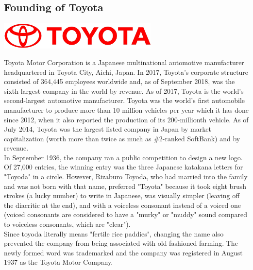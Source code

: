 \documentclass[11pt]{report}
\begin{document}
\subsection{Founding of Toyota}
\vspace{2mm}\begin{center}\includegraphics[width=8cm]{./img/toyotaLogo.jpg}\end{center}
Toyota Motor Corporation is a Japanese multinational automotive manufacturer headquartered in Toyota City, Aichi, Japan. In 2017, Toyota's corporate structure consisted of 364,445 employees worldwide and, as of September 2018, was the sixth-largest company in the world by revenue. As of 2017, Toyota is the world's second-largest automotive manufacturer. Toyota was the world's first automobile manufacturer to produce more than 10 million vehicles per year which it has done since 2012, when it also reported the production of its 200-millionth vehicle. As of July 2014, Toyota was the largest listed company in Japan by market capitalization (worth more than twice as much as \#2-ranked SoftBank) and by revenue.\\ \indent In September 1936, the company ran a public competition to design a new logo. Of 27,000 entries, the winning entry was the three Japanese katakana letters for "Toyoda" in a circle. However, Rizaburo Toyoda, who had married into the family and was not born with that name, preferred "Toyota" because it took eight brush strokes (a lucky number) to write in Japanese, was visually simpler (leaving off the diacritic at the end), and with a voiceless consonant instead of a voiced one (voiced consonants are considered to have a "murky" or "muddy" sound compared to voiceless consonants, which are "clear").\\ \indent Since toyoda literally means "fertile rice paddies", changing the name also prevented the company from being associated with old-fashioned farming. The newly formed word was trademarked and the company was registered in August 1937 as the Toyota Motor Company.
\section{}
\end{document}
